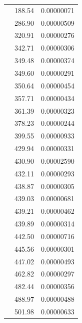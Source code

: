 \documentclass[10pt,preprint,twocolumn]{acmart}
\begin{document}
\tablelasttail{%
  \hline
}
\begin{supertabular}{|r|l|l|}
 & 188.54 & 0.00000071 \\
 & 286.90 & 0.00000509 \\
 & 320.91 & 0.00000276 \\
 & 342.71 & 0.00000306 \\
 & 349.48 & 0.00000374 \\
 & 349.60 & 0.00000291 \\
 & 350.64 & 0.00000454 \\
 & 357.71 & 0.00000434 \\
 & 361.39 & 0.00000323 \\
 & 378.23 & 0.00000244 \\
 & 399.55 & 0.00000933 \\
 & 429.94 & 0.00000331 \\
 & 430.90 & 0.00002590 \\
 & 432.11 & 0.00000293 \\
 & 438.87 & 0.00000305 \\
 & 439.03 & 0.00000681 \\
 & 439.21 & 0.00000462 \\
 & 439.89 & 0.00000314 \\
 & 442.50 & 0.00000716 \\
 & 445.56 & 0.00000301 \\
 & 447.02 & 0.00000493 \\
 & 462.82 & 0.00000297 \\
 & 482.44 & 0.00000356 \\
 & 488.97 & 0.00000488 \\
 & 501.98 & 0.00000633 \\

\end{supertabular}
\end{document}

